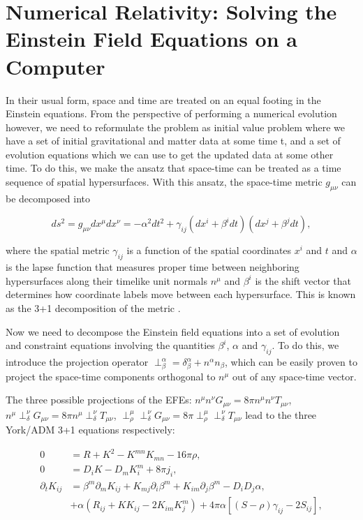 \documentclass{ut-thesis}
\begin{document}
\section{Numerical Relativity: Solving the Einstein Field Equations on a Computer}



In their usual form, space and time are treated on an equal footing in the Einstein equations. From the perspective of performing a numerical evolution however, we need to reformulate the problem as initial value problem where we have a set of initial gravitational and matter data at some time t, and a set of evolution equations which we can use to get the updated data at some other time. To do this, we make the ansatz that space-time can be treated as a time sequence of spatial hypersurfaces. With this ansatz, the space-time metric $g_{\mu\nu}$ can be decomposed into

\begin{equation}
\label{eq:4}
ds^{2} = g_{\mu\nu}dx^{\mu}dx^{\nu} = -\alpha^2dt^2 + \gamma_{ij}(dx^i+\beta^idt)(dx^j+\beta^jdt),
\end{equation}

where the spatial metric $\gamma_{ij}$ is a function of the spatial coordinates $x^{i}$ and $t$ and $\alpha$ is the lapse function that measures proper time between neighboring hypersurfaces along their timelike unit normals $n^{\mu}$ and $\beta^i$ is the shift vector that determines how coordinate labels move between each hypersurface. This is known as the 3+1 decomposition of the metric \cite{arnowitt2008republication}.

Now we need to decompose the Einstein field equations into a set of evolution and constraint equations involving the quantities $\beta^i$, $\alpha$ and $\gamma_{ij}$. To do this, we introduce the projection operator $\perp^{\alpha}_{\beta} = \delta^{\alpha}_{\beta} + n^{\alpha} n_{\beta}$, which can be easily proven to project the space-time components orthogonal to $n^{\mu}$ out of any space-time vector.

The three possible projections of the EFEs: $n^{\mu} n^{\nu} G_{\mu\nu} = 8\pi n^{\mu} n^{\nu} T_{\mu\nu}$, $n^{\mu}\perp^{\nu}_{\delta}G_{\mu\nu} = 8\pi n^{\mu} \perp^{\nu}_{\delta} T_{\mu\nu}$, $\perp^{\mu}_{\rho} \perp^{\nu}_{\delta} G_{\mu\nu} = 8\pi \perp^{\mu}_{\rho} \perp^{\nu}_{\delta} T_{\mu\nu}$ lead to the three York/ADM 3+1 equations respectively:

\begin{equation}
\label{eq:5}
\begin{split}
0 &= R + K^{2} - K^{mn}K_{mn} -16\pi\rho, \\
0 &= D_iK - D_mK^m_i + 8\pi j_i, \\
\partial_t K_{ij} &= \beta^m\partial_mK_{ij} + K_{mj}\partial_i\beta^m + K_{im}\partial_j\beta^m - D_iD_j\alpha, \\ 
&+ \alpha(R_{ij}+KK_{ij}-2K_{im}K^m_{j})+4\pi\alpha[(S-\rho)\gamma_{ij}-2S_{ij}],
\end{split} 
\end{equation}
\end{document}
